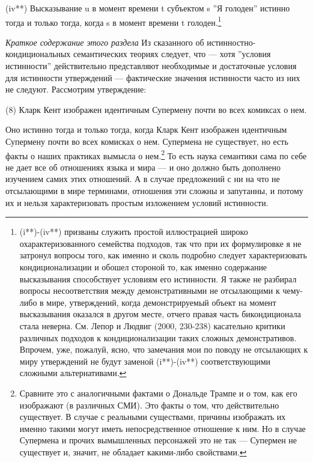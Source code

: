 \documentclass[11pt]{book}
\begin{document}
(iv**) Высказывание u в момент времени t субъектом s ''Я голоден'' истинно тогда и только тогда, когда s в момент времени t голоден.\footnote{(i**)-(iv**) призваны служить простой иллюстрацией широко охарактеризованного семейства подходов, так что при их формулировке я не затронул вопросы того, как именно и сколь подробно следует характеризовать кондиционализации и обошел стороной то, как именно содержание высказывания способствует условиям его истинности. Я также не разбирал вопросы несоответствия между демонстративными не отсылающими к чему-либо в мире, утверждений, когда демонстрируемый объект на момент высказывания оказался в другом месте, отчего правая часть бикондиционала стала неверна. См. Лепор и Людвиг (2000, 230-238) касательно критики различных подходов к кондиционализации таких сложных демонстративов. Впрочем, уже, пожалуй, ясно, что замечания мои по поводу не отсылающих к миру утверждений не будут заменой (i**)-(iv**) соответствующими сложными альтернативами.}

\smallskip

\textit{Краткое содержание этого раздела} \quad Из сказанного об истинностно-кондициональных семантических теориях следует, что --- хотя ''условия истинности'' действительно представляют необходимые и достаточные условия для истинности утверждений --- фактические значения истинности часто из них не следуют. Рассмотрим утверждение:

\smallskip

(8) Кларк Кент изображен идентичным Супермену почти во всех комиксах о нем.

\smallskip

Оно истинно тогда и только тогда, когда Кларк Кент изображен идентичным Супермену почти во всех комисках о нем. Супермена не существует, но есть факты о наших практиках вымысла о нем.\footnote{Сравните это с аналогичными фактами о Дональде Трампе и о том, как его изображают (в различных СМИ). Это факты о том, что действительно существует. В случае с реальными существами, причины изображать их именно такими могут иметь непосредственное отношение к ним. Но в случае Супермена и прочих вымышленных персонажей это не так --- Супермен не существует и, значит, не обладает какими-либо свойствами.} То есть наука семантики сама по себе не дает все об отношениях языка и мира --- и оно должно быть дополнено изучением самих этих отношений. А в случае предложений с ни на что не отсылающими в мире терминами, отношения эти сложны и запутанны, и потому их и нельзя характеризовать простым изложением условий истинности.
\end{document}
